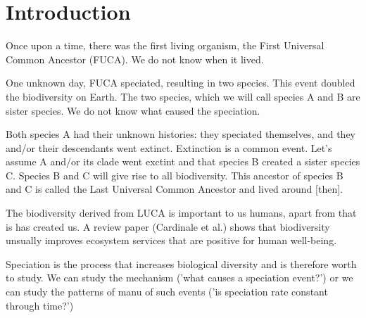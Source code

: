 \chapter{Introduction}
\label{chapter_introduction}
\newpage

\noindent

Once upon a time, there was the first living organism, the 
First Universal Common Ancestor (FUCA).
We do not know when it lived.

% 
%

One unknown day, FUCA speciated, resulting in two species.
This event doubled the biodiversity on Earth.
The two species, which we will call species A and B
are sister species.
We do not know what caused the speciation.

%

Both species A had their unknown histories: they speciated themselves,
and they and/or their descendants went extinct. 
Extinction is a common event. Let's assume A and/or its clade went
exctint and that species B created a sister species C. Species B
and C will give rise to all biodiversity. This ancestor of species B and C 
is called the Last Universal Common Ancestor and lived around [then].

            
%

The biodiversity derived from LUCA is important to us humans, apart from
that is has created us. A review paper (Cardinale et al.) shows that 
biodiversity unsually improves ecosystem services that are 
positive for human well-being.

%
%
%
%

Speciation is the process that increases biological diversity 
and is therefore worth to study. We can study the mechanism ('what
causes a speciation event?') or we can study the patterns of manu
of such events ('is speciation rate constant through time?')
%
%

